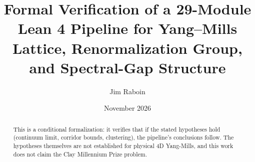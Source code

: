 \documentclass[11pt]{article}
\title{Formal Verification of a 29-Module Lean 4 Pipeline for Yang--Mills Lattice, Renormalization Group, and Spectral-Gap Structure}
\author{Jim Raboin}
\date{November 2026}
\begin{document}
\maketitle

\begin{abstract}
This is a conditional formalization: it verifies that if the stated hypotheses hold (continuum limit, corridor bounds, clustering), the pipeline's conclusions follow. The hypotheses themselves are not established for physical 4D Yang-Mills, and this work does not claim the Clay Millennium Prize problem.
\end{abstract}


\end{document}
